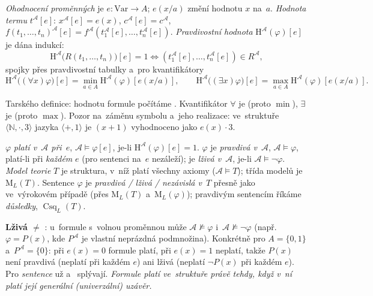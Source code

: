 \documentclass[11pt,a4paper]{article}
\newcommand{\Mset}{\mathrm{M}}              %
\newcommand{\Csq}{\operatorname{Csq}}       %
\begin{document}
\begin{definice}
\emph{Ohodnocení proměnných} je $e\colon\mathrm{Var}\to A$; $e(x/a)$ změní hodnotu $x$ na~$a$. \emph{Hodnota termu} $t^{\mathcal A}[e]$: $x^{\mathcal A}[e]=e(x)$, $c^{\mathcal A}[e]=c^{\mathcal A}$, $f(t_1,\dots,t_n)^{\mathcal A}[e]=f^{\mathcal A}(t_1^{\mathcal A}[e],\dots,t_n^{\mathcal A}[e])$. \emph{Pravdivostní hodnota} $\mathrm{H}^{\mathcal A}(\varphi)[e]$ je dána indukcí:
\[
\mathrm{H}^{\mathcal A}\big(R(t_1,\dots,t_n)\big)[e]=1\iff(t_1^{\mathcal A}[e],\dots,t_n^{\mathcal A}[e])\in R^{\mathcal A},
\]
spojky přes pravdivostní tabulky a~pro kvantifikátory
\[
\mathrm{H}^{\mathcal A}\big((\forall x)\varphi\big)[e]=\min_{a\in A}\mathrm{H}^{\mathcal A}(\varphi)[e(x/a)],\qquad
\mathrm{H}^{\mathcal A}\big((\exists x)\varphi\big)[e]=\max_{a\in A}\mathrm{H}^{\mathcal A}(\varphi)[e(x/a)].
\]
\end{definice}

\begin{intuice}
Tarského definice: hodnotu formule počítáme . Kvantifikátor $\forall$ je  (proto $\min$), $\exists$ je  (proto $\max$). Pozor na~záměnu symbolu a~jeho realizace: ve~struktuře $\langle\mathbb{N},\cdot,3\rangle$ jazyka $\langle+,1\rangle$ je $(x+1)$ vyhodnoceno jako $e(x)\cdot 3$.
\end{intuice}

\begin{definice}
$\varphi$ \emph{platí v~$\mathcal A$ při~$e$}, $\mathcal A\models\varphi[e]$, je-li $\mathrm{H}^{\mathcal A}(\varphi)[e]=1$. $\varphi$ je \emph{pravdivá v~$\mathcal A$}, $\mathcal A\models\varphi$, platí-li při \emph{každém} $e$ (pro sentenci na~$e$ nezáleží); je \emph{lživá v~$\mathcal A$}, je-li $\mathcal A\models\neg\varphi$. \emph{Model teorie} $T$ je struktura, v~níž platí všechny axiomy ($\mathcal A\models T$); třída modelů je $\Mset_L(T)$. Sentence $\varphi$ je \emph{pravdivá / lživá / nezávislá v~$T$} přesně jako ve~výrokovém případě (přes $\Mset_L(T)$ a~$\Mset_L(\varphi)$); pravdivým sentencím říkáme \emph{důsledky}, $\Csq_L(T)$.
\end{definice}

\begin{poznamka}
\textbf{Lživá $\neq$ }: u~formule s~volnou proměnnou může $\mathcal A\not\models\varphi$ i~$\mathcal A\not\models\neg\varphi$ (např.\ $\varphi=P(x)$, kde $P^{\mathcal A}$ je vlastní neprázdná podmnožina). Konkrétně pro $A=\{0,1\}$ a~$P^{\mathcal A}=\{0\}$: při $e(x)=0$ formule platí, při $e(x)=1$ neplatí, takže $P(x)$ není pravdivá (neplatí při každém $e$) ani lživá (neplatí $\neg P(x)$ při každém $e$). Pro \emph{sentence} už  a~ splývají. \emph{Formule platí ve~struktuře právě tehdy, když v~ní platí její generální (univerzální) uzávěr.}
\end{poznamka}
\end{document}
